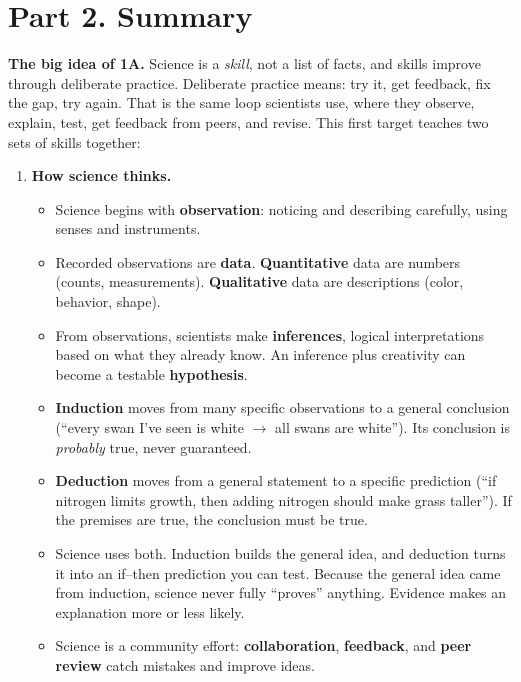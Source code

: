 \documentclass[11pt,letterpaper]{article}
\begin{document}
\section{Part 2. Summary}

\textbf{The big idea of 1A.} Science is a \emph{skill}, not a list of facts, and skills improve through deliberate practice. Deliberate practice means: try it, get feedback, fix the gap, try again. That is the same loop scientists use, where they observe, explain, test, get feedback from peers, and revise. This first target teaches two sets of skills together:


\begin{enumerate}
  \item \textbf{How science thinks.}
  \begin{itemize}
    \item Science begins with \textbf{observation}: noticing and describing carefully, using senses and instruments.
    \item Recorded observations are \textbf{data}. \textbf{Quantitative} data are numbers (counts, measurements). \textbf{Qualitative} data are descriptions (color, behavior, shape).
    \item From observations, scientists make \textbf{inferences}, logical interpretations based on what they already know. An inference plus creativity can become a testable \textbf{hypothesis}.
    \item \textbf{Induction} moves from many specific observations to a general conclusion (``every swan I've seen is white $\rightarrow$ all swans are white''). Its conclusion is \emph{probably} true, never guaranteed.
    \item \textbf{Deduction} moves from a general statement to a specific prediction (``if nitrogen limits growth, then adding nitrogen should make grass taller''). If the premises are true, the conclusion must be true.
    \item Science uses both. Induction builds the general idea, and deduction turns it into an if–then prediction you can test. Because the general idea came from induction, science never fully ``proves'' anything. Evidence makes an explanation more or less likely.
    \item Science is a community effort: \textbf{collaboration}, \textbf{feedback}, and \textbf{peer review} catch mistakes and improve ideas.
  \end{itemize}
\end{enumerate}
\end{document}
